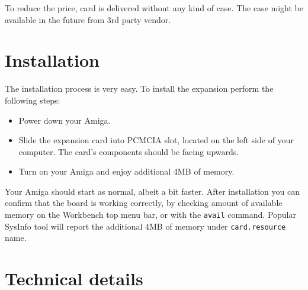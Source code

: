 \documentclass[10pt,a5paper]{article}
\begin{document}
To reduce the price, card is delivered without any kind of case. The case might be available in the future from 3rd party vendor.

\section*{Installation}

The installation process is very easy. To install the expansion perform the following steps:

\begin{itemize}
	\item Power down your Amiga.
	\item Slide the expansion card into PCMCIA slot, located on the left side of your computer. The card's components should be facing upwards.
	\item Turn on your Amiga and enjoy additional 4MB of memory.
\end{itemize}

Your Amiga should start as normal, albeit a bit faster. After installation you can confirm that the board is working correctly, by checking amount of available memory on the Workbench top menu bar, or with the {\tt avail} command. Popular SysInfo tool will report the additional 4MB of memory under {\tt card.resource} name.

\section*{Technical details}
\end{document}
